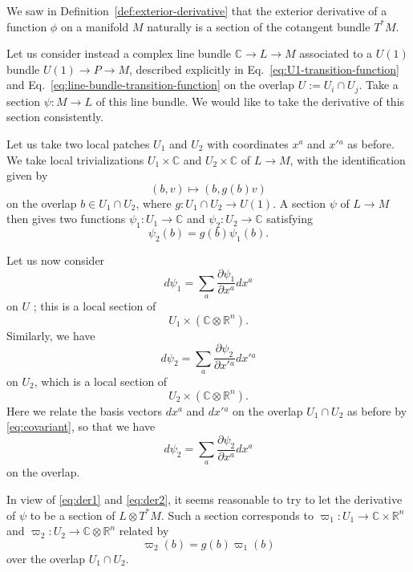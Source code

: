 \documentclass[12pt]{article}
\numberwithin{equation}{section}
\numberwithin{figure}{section}
\theoremstyle{remark}
\def\bC{\mathbb{C}}
\def\bR{\mathbb{R}}
\begin{document}
We saw in Definition~\ref{def:exterior-derivative} that 
the exterior derivative of a function $\phi$ on a manifold $M$
naturally is a section of the cotangent bundle $T^*M$.

Let us consider instead a complex line bundle $\bC\to L\to M$
associated to a $U(1)$ bundle $U(1)\to P\to M$,
described explicitly in Eq.~\ref{eq:U1-transition-function} and Eq.~\ref{eq:line-bundle-transition-function}
on the overlap $U:=U_i\cap U_j$.
Take a section $\psi:M\to L$ of this line bundle.
We would like to take the derivative of this section consistently.

Let us take two local patches $U_1$ and $U_2$ with coordinates $x^a$ and $x'{}^a$ as before.
We take local trivializations $U_1\times \bC$ and $U_2\times \bC$ of $L\to M$,
with the identification given by \begin{equation}
(b,v)\mapsto (b, g(b)v) 
\end{equation} on the overlap $b\in U_1\cap U_2$, where $g: U_1\cap U_2\to U(1)$.
A section $\psi$ of $L\to M$ then gives two functions
$\psi_1: U_1\to \bC$ and $\psi_2: U_2\to \bC$ satisfying \begin{equation}
  \psi_2(b) = g(b) \psi_1(b). \label{eq:psi}
\end{equation}

Let us now consider \begin{equation}
  d\psi_1 = \sum_a \frac{\partial \psi_1}{\partial x^a} dx^a
\end{equation} on $U$ ; this is a local section of \begin{equation}
  U_1 \times (\bC \otimes \bR^n). \label{eq:der1}
\end{equation}
Similarly, we have
\begin{equation}
  d\psi_2 = \sum_a \frac{\partial \psi_2}{\partial x'{}^a} dx'{}^a
  \label{eq:dpsiprime}
\end{equation} on $U_2$, which is a local section of \begin{equation}
  U_2 \times (\bC \otimes \bR^n). \label{eq:der2}
\end{equation}
Here we relate the basis vectors $dx^a$ and $dx'{}^a$ on the overlap $U_1\cap U_2$
as before by \eqref{eq:covariant}, so that we have \begin{equation}
  d\psi_2= \sum_a \frac{\partial \psi_2}{\partial x^a} dx^a
\end{equation}
on the overlap.

In view of \eqref{eq:der1} and \eqref{eq:der2},
it seems reasonable to try to let the derivative of $\psi$ to be a section of $L\otimes T^*M$. 
Such a section corresponds to $\varpi_1: U_1\to \bC\times \bR^n$
and $\varpi_2: U_2\to \bC \otimes \bR^n$ related by \begin{equation}
  \varpi_2(b) = g(b) \varpi_1(b)
\end{equation} over the overlap $U_1\cap U_2$.
\end{document}
